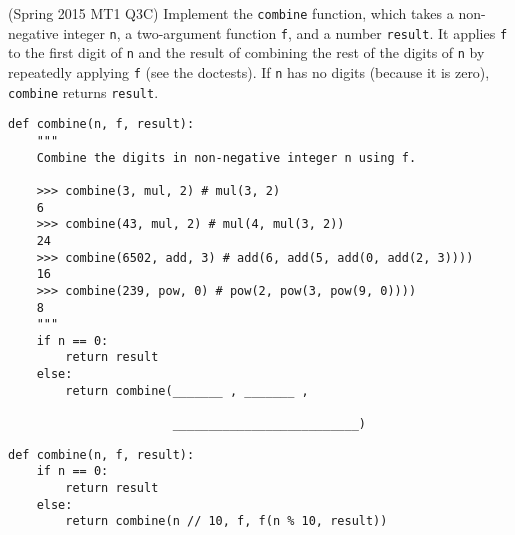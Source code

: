 \begin{blocksection}
\question (Spring 2015 MT1 Q3C) Implement the \lstinline$combine$ function, which takes a non-negative integer
\lstinline$n$, a two-argument function \lstinline$f$, and a number \lstinline$result$. It applies
\lstinline$f$ to the first digit of \lstinline$n$ and the result of combining the rest of the digits of \lstinline$n$
by repeatedly applying \lstinline$f$ (see the doctests). If \lstinline$n$ has no digits (because it is zero),
\lstinline$combine$ returns \lstinline$result$.

\begin{lstlisting}
def combine(n, f, result):
    """
    Combine the digits in non-negative integer n using f.
    
    >>> combine(3, mul, 2) # mul(3, 2)
    6
    >>> combine(43, mul, 2) # mul(4, mul(3, 2))
    24
    >>> combine(6502, add, 3) # add(6, add(5, add(0, add(2, 3))))
    16
    >>> combine(239, pow, 0) # pow(2, pow(3, pow(9, 0))))
    8
    """
    if n == 0:
        return result
    else:
        return combine(_______ , _______ , 
				               
                       __________________________)
\end{lstlisting}

\begin{solution}[1.5in]
\begin{lstlisting}
def combine(n, f, result):
    if n == 0:
        return result
    else:
        return combine(n // 10, f, f(n % 10, result))
\end{lstlisting}
\end{solution}
\end{blocksection}

